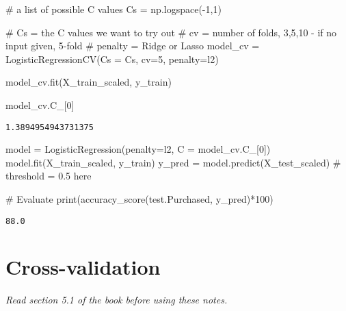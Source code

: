 \documentclass[
  letterpaper,
  DIV=11,
  numbers=noendperiod]{scrreprt}
\newenvironment{Shaded}{\begin{snugshade}}{\end{snugshade}}
\newcommand{\BuiltInTok}[1]{\textcolor[rgb]{0.00,0.23,0.31}{#1}}
\newcommand{\CommentTok}[1]{\textcolor[rgb]{0.37,0.37,0.37}{#1}}
\newcommand{\DecValTok}[1]{\textcolor[rgb]{0.68,0.00,0.00}{#1}}
\newcommand{\NormalTok}[1]{\textcolor[rgb]{0.00,0.23,0.31}{#1}}
\newcommand{\OperatorTok}[1]{\textcolor[rgb]{0.37,0.37,0.37}{#1}}
\newcommand{\StringTok}[1]{\textcolor[rgb]{0.13,0.47,0.30}{#1}}
\begin{document}
\begin{Shaded}
\begin{Highlighting}[]
\CommentTok{\# a list of possible C values}
\NormalTok{Cs }\OperatorTok{=}\NormalTok{ np.logspace(}\OperatorTok{{-}}\DecValTok{1}\NormalTok{,}\DecValTok{1}\NormalTok{)}

\CommentTok{\# Cs =  the C values we want to try out}
\CommentTok{\# cv = number of folds, 3,5,10 {-} if no input given, 5{-}fold}
\CommentTok{\# penalty = Ridge or Lasso}
\NormalTok{model\_cv }\OperatorTok{=}\NormalTok{ LogisticRegressionCV(Cs }\OperatorTok{=}\NormalTok{ Cs, cv}\OperatorTok{=}\DecValTok{5}\NormalTok{, penalty}\OperatorTok{=}\StringTok{\textquotesingle{}l2\textquotesingle{}}\NormalTok{)}

\NormalTok{model\_cv.fit(X\_train\_scaled, y\_train)}

\NormalTok{model\_cv.C\_[}\DecValTok{0}\NormalTok{]}
\end{Highlighting}
\end{Shaded}

\begin{verbatim}
1.3894954943731375
\end{verbatim}

\begin{Shaded}
\begin{Highlighting}[]
\NormalTok{model }\OperatorTok{=}\NormalTok{ LogisticRegression(penalty}\OperatorTok{=}\StringTok{\textquotesingle{}l2\textquotesingle{}}\NormalTok{, C }\OperatorTok{=}\NormalTok{ model\_cv.C\_[}\DecValTok{0}\NormalTok{])}
\NormalTok{model.fit(X\_train\_scaled, y\_train)}
\NormalTok{y\_pred }\OperatorTok{=}\NormalTok{ model.predict(X\_test\_scaled) }\CommentTok{\# threshold = 0.5 here}

\CommentTok{\# Evaluate}
\BuiltInTok{print}\NormalTok{(accuracy\_score(test.Purchased, y\_pred)}\OperatorTok{*}\DecValTok{100}\NormalTok{)}
\end{Highlighting}
\end{Shaded}

\begin{verbatim}
88.0
\end{verbatim}


\chapter{Cross-validation}\label{cross-validation}

\emph{Read section 5.1 of the book before using these notes.}
\end{document}
